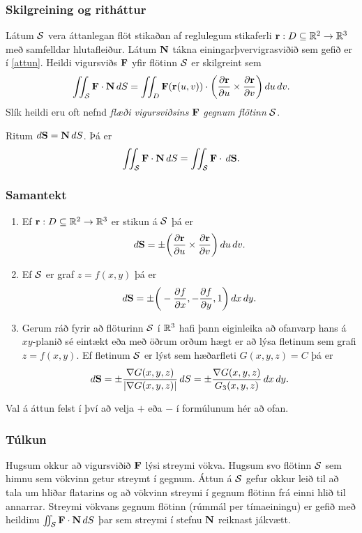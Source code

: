 \subsubsection{Skilgreining og ritháttur \rtask{}}
 Látum $\cal S$ vera áttanlegan flöt stikaðan
af reglulegum stikaferli  $\mbox{${\bf r}$}:D\subseteq{\mathbb R}^2\rightarrow {\mathbb R}^3$ með
samfelldar hlutafleiður.  Látum $\mbox{${\bf N}$}$ tákna einingarþver\-vigrasviðið
sem gefið er í \ref{attun}.  Heildi vigursviðs $\mbox{${\bf F}$}$ yfir flötinn $\cal S$ er
skilgreint sem 
$$\int\!\!\!\int_{\cal S} \mbox{${\bf F}$}\cdot\mbox{${\bf N}$}\,dS
=\int\!\!\!\int_D \mbox{${\bf F}$}(\mbox{${\bf r}$}(u,v))\cdot \bigg(
\frac{\partial \mbox{${\bf r}$}}{\partial u}\times\frac{\partial \mbox{${\bf r}$}}{\partial
  v}\bigg)\,
du\,dv.$$
Slík heildi eru oft nefnd \emph{flæði vigursviðsins} $\mbox{${\bf F}$}$ {\em gegnum flötinn} $\cal S$.

\bigskip
 Ritum $d\mbox{${\bf S}$}=\mbox{${\bf N}$}\,dS$.  Þá  er 
$$\int\!\!\!\int_{\cal S} \mbox{${\bf F}$}\cdot\mbox{${\bf N}$}\,dS=\int\!\!\!\int_{\cal S} \mbox{${\bf F}$}\cdot\,d\mbox{${\bf S}$}.$$



\subsubsection{Samantekt \rtask{}}
  
\begin{enumerate}
\item Ef $\mbox{${\bf r}$}:D\subseteq{\mathbb R}^2\rightarrow {\mathbb R}^3$ er stikun á $\cal S$ þá
  er $$d\mbox{${\bf S}$}=\pm \bigg(\frac{\partial \mbox{${\bf r}$}}{\partial u}\times\frac{\partial
  \mbox{${\bf r}$}}{\partial v}\bigg)\,du\,dv.$$
\item Ef $\cal S$ er graf $z=f(x,y)$ þá er 
$$d\mbox{${\bf S}$}=\pm\bigg(-\frac{\partial f}{\partial x},-\frac{\partial
  f}{\partial y},1\bigg)\,dx\,dy.$$
\item Gerum ráð fyrir að flöturinn $\cal S$ í ${\mathbb R}^3$ hafi þann eiginleika að
  ofanvarp hans á $xy$-planið sé eintækt eða með öðrum orðum hægt er
  að lýsa fletinum sem grafi $z=f(x,y)$.
Ef fletinum $\cal S$ er lýst sem 
hæðarfleti $G(x,y,z)=C$ þá er  
$$d\mbox{${\bf S}$}=\pm\frac{\nabla G(x,y,z)}{|\nabla G(x,y,z)|}\,dS=
\pm\frac{\nabla G(x,y,z)}{G_3(x,y,z)}\,dx\,dy.$$
\end{enumerate}
Val á áttun felst í því að velja $+$ eða $-$ í formúlunum hér að
ofan.  





\subsubsection{Túlkun \rtask{}}
 Hugsum okkur að vigursviðið $\mbox{${\bf F}$}$ lýsi streymi
vökva.  Hugsum svo flötinn $\cal S$ sem himnu sem vökvinn getur
streymt í gegnum.  Áttun á $\cal S$ gefur okkur leið til að tala um
hliðar flatarins og að vökvinn streymi í gegnum flötinn frá
einni hlið til annarrar.  Streymi vökvans gegnum flötinn (rúmmál per
tímaeiningu) er gefið með heildinu $\int\!\!\!\int_{\cal S} \mbox{${\bf F}$}\cdot\mbox{${\bf N}$}\,dS$
  þar sem streymi í stefnu $\mbox{${\bf N}$}$ reiknast jákvætt.

